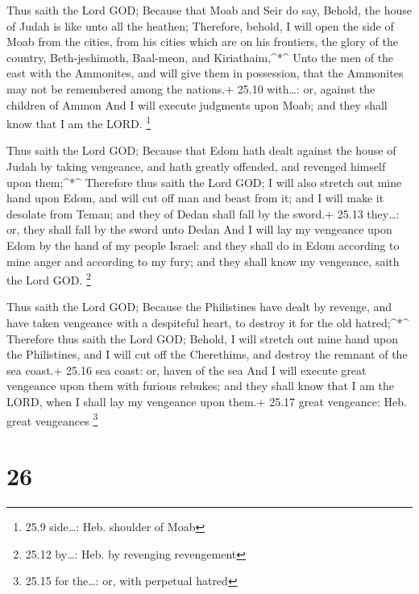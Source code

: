  Thus saith the Lord GOD; Because that Moab and Seir do say,
Behold, the house of Judah is like unto all the heathen; 
Therefore, behold, I will open the side of Moab from the cities, from
his cities which are on his frontiers, the glory of the country,
Beth-jeshimoth, Baal-meon, and Kiriathaim,\^{}*\^{}  Unto
the men of the east with the Ammonites, and will give them in
possession, that the Ammonites may not be remembered among the nations.+
25.10 with\ldots: or, against the children of Ammon  And I
will execute judgments upon Moab; and they shall know that I am the
LORD. \footnote{25.9 side\ldots: Heb. shoulder of Moab}

 Thus saith the Lord GOD; Because that Edom hath dealt
against the house of Judah by taking vengeance, and hath greatly
offended, and revenged himself upon them;\^{}*\^{} 
Therefore thus saith the Lord GOD; I will also stretch out mine hand
upon Edom, and will cut off man and beast from it; and I will make it
desolate from Teman; and they of Dedan shall fall by the sword.+ 25.13
they\ldots: or, they shall fall by the sword unto Dedan 
And I will lay my vengeance upon Edom by the hand of my people Israel:
and they shall do in Edom according to mine anger and according to my
fury; and they shall know my vengeance, saith the Lord GOD. \footnote{25.12
  by\ldots: Heb. by revenging revengement}

 Thus saith the Lord GOD; Because the Philistines have
dealt by revenge, and have taken vengeance with a despiteful heart, to
destroy it for the old hatred;\^{}*\^{}  Therefore thus
saith the Lord GOD; Behold, I will stretch out mine hand upon the
Philistines, and I will cut off the Cherethims, and destroy the remnant
of the sea coast.+ 25.16 sea coast: or, haven of the sea 
And I will execute great vengeance upon them with furious rebukes; and
they shall know that I am the LORD, when I shall lay my vengeance upon
them.+ 25.17 great vengeance: Heb. great vengeances \footnote{25.15 for
  the\ldots: or, with perpetual hatred}

\hypertarget{section-25}{%
\section{26}\label{section-25}}

